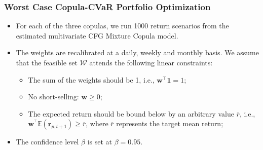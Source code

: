 \documentclass[pdf,10pt,xcolor=dvipsnames,hide notes]{beamer}
\begin{document}
\begin{frame}[label=frame5d]
\frametitle{Worst Case Copula-CVaR Portfolio Optimization}

\setlength{\parskip}{15pt}

\begin{itemize}
\justifying
\setlength{\parskip}{15pt}

	\item For each of the three copulas, we run 1000 return scenarios from the
	estimated multivariate CFG Mixture Copula model.
	
	\item The weights are recalibrated at a daily, weekly and monthly basis. We assume
	that the feasible set $\mathcal{W}$ attends the following linear constraints:
	
	\setlength{\parskip}{2pt}
	
	\begin{itemize}
		
		\item The sum of the weights should be 1, i.e., $\mathbf{w}^{\top }\mathbf{1=}1$; 
		
		\item No short-selling: $\mathbf{w\geq }0$;
		
		\item The expected return should be bound below by an arbitrary value $\overline{r}$, i.e., $\mathbf{w}^{^{\top }}\mathbb{E}\left( \mathbf{r}%
		_{p,t+1}\right) \mathbf{\geq }\overline{r}$, where $\overline{r}$ represents the target mean return;
		
		\end{itemize}
	
	\setlength{\parskip}{15pt}
	
	\item The confidence level $\beta $ is set at $\beta =0.95$.
	
\end{itemize}

\end{frame}
\end{document}

